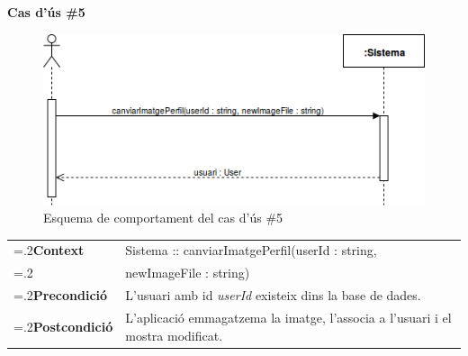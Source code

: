 \clearpage
\noindent\textbf{\large Cas d'ús \#5}\\
\begin{figure}[H]
\centering
\includegraphics[scale=0.6]{Figures/casdus_05.png}
\caption{Esquema de comportament del cas d'ús \#5}
\end{figure}
\begin{table}[h]
\noindent
\begin{tabularx}{\linewidth}{
>{\hsize=.2\hsize}X%
>{\hsize=0.8\hsize}X%
}
\textbf{Context} 		& Sistema :: canviarImatgePerfil(userId : string, \\
						& newImageFile : string) \\
\textbf{Precondició} 	& L'usuari amb id \textit{userId} existeix dins la base de dades. \\
\textbf{Postcondició}	& L'aplicació emmagatzema la imatge, l'associa a l'usuari i el mostra modificat. \\
\end{tabularx}
\label{}
\end{table}

